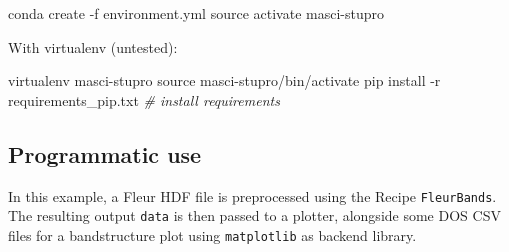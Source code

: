 \documentclass[]{article}
\newenvironment{Shaded}{}{}
\newcommand{\CommentTok}[1]{\textcolor[rgb]{0.38,0.63,0.69}{\textit{#1}}}
\newcommand{\BuiltInTok}[1]{#1}
\newcommand{\ExtensionTok}[1]{#1}
\newcommand{\NormalTok}[1]{#1}
\begin{document}
\begin{Shaded}
\begin{Highlighting}[]
\ExtensionTok{conda}\NormalTok{ create -f environment.yml}
\BuiltInTok{source}\NormalTok{ activate masci-stupro}
\end{Highlighting}
\end{Shaded}

With virtualenv (untested):

\begin{Shaded}
\begin{Highlighting}[]
\ExtensionTok{virtualenv}\NormalTok{ masci-stupro}
\BuiltInTok{source}\NormalTok{ masci-stupro/bin/activate}
\ExtensionTok{pip}\NormalTok{ install -r requirements_pip.txt }\CommentTok{# install requirements}
\end{Highlighting}
\end{Shaded}

\subsection{Programmatic use}\label{programmatic-use}

In this example, a Fleur HDF file is preprocessed using the Recipe
\texttt{FleurBands}. The resulting output \texttt{data} is then passed
to a plotter, alongside some DOS CSV files for a bandstructure plot
using \texttt{matplotlib} as backend library.
\end{document}
